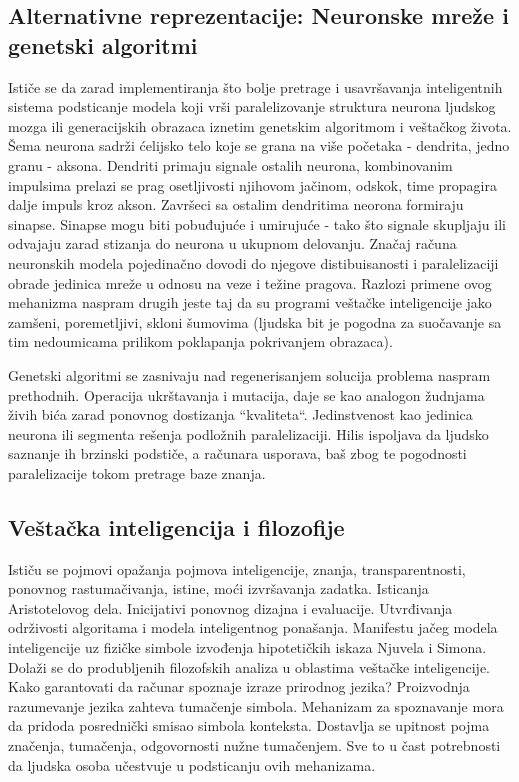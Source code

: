\documentclass[fontsize=11bp, paper=a4]{scrartcl}
\begin{document}
\subsection{\normalsize{Alternativne reprezentacije: Neuronske mreže i genetski algoritmi}}
Ističe se da zarad implementiranja što bolje pretrage i usavršavanja inteligentnih sistema podsticanje modela koji vrši paralelizovanje struktura neurona ljudskog mozga ili generacijskih obrazaca iznetim genetskim algoritmom i veštačkog života. Šema neurona sadrži ćelijsko telo koje se grana na više početaka - dendrita, jedno granu - aksona. Dendriti primaju signale ostalih neurona, kombinovanim impulsima prelazi se prag osetljivosti njihovom jačinom, odskok, time propagira dalje impuls kroz akson. Završeci sa ostalim dendritima neorona formiraju sinapse. Sinapse mogu biti pobuđujuće i umirujuće - tako što signale skupljaju ili odvajaju zarad stizanja do neurona u ukupnom delovanju.
Značaj računa neuronskih modela pojedinačno dovodi do njegove distibuisanosti i paralelizaciji obrade jedinica mreže u odnosu na veze i težine pragova. Razlozi primene ovog mehanizma naspram drugih jeste taj da su programi veštačke inteligencije jako zamšeni, poremetljivi, skloni šumovima (ljudska bit je pogodna za suočavanje sa tim nedoumicama prilikom poklapanja pokrivanjem obrazaca).

Genetski algoritmi se zasnivaju nad regenerisanjem solucija problema naspram prethodnih. Operacija ukrštavanja i mutacija, daje se kao analogon žudnjama živih bića zarad ponovnog dostizanja ``kvaliteta``. Jedinstvenost kao jedinica neurona ili segmenta rešenja podložnih paralelizaciji. Hilis ispoljava da ljudsko saznanje ih brzinski podstiče, a računara usporava, baš zbog te pogodnosti paralelizacije tokom pretrage baze znanja. 

\subsection{\normalsize{Veštačka inteligencija i filozofije}}
Ističu se pojmovi opažanja pojmova inteligencije, znanja, transparentnosti, ponovnog rastumačivanja, istine, moći izvršavanja zadatka. Isticanja Aristotelovog dela. Inicijativi ponovnog dizajna i evaluacije. Utvrđivanja održivosti algoritama i modela inteligentnog ponašanja. Manifestu jačeg modela inteligencije uz fizičke simbole izvođenja hipotetičkih iskaza Njuvela i Simona.
Dolaži se do produbljenih filozofskih analiza u oblastima veštačke inteligencije. Kako garantovati da računar spoznaje izraze prirodnog jezika? Proizvodnja razumevanje jezika zahteva tumačenje simbola. Mehanizam za spoznavanje mora da pridoda posrednički smisao simbola konteksta. Dostavlja se upitnost pojma značenja, tumačenja, odgovornosti nužne tumačenjem. Sve to u čast potrebnosti da ljudska osoba učestvuje u podsticanju ovih mehanizama.
\end{document}
